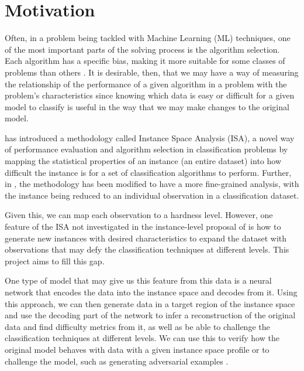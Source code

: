 \section{Motivation}
Often, in a problem being tackled with Machine Learning (ML) techniques, one of the most important parts of the solving process is the algorithm selection. Each algorithm has a specific bias, making it more suitable for some classes of problems than others \cite{Adam2019}. It is desirable, then, that we may have a way of measuring the relationship of the performance of a given algorithm in a problem with the problem's characteristics since knowing which data is easy or difficult for a given model to classify is useful in the way that we may make changes to the original model.

 has introduced a methodology called Instance Space Analysis (ISA), a novel way of performance evaluation and algorithm selection in classification problems by mapping the statistical properties of an instance (an entire dataset) into how difficult the instance is for a set of classification algorithms to perform. Further, in , the methodology has been modified to have a more fine-grained analysis, with the instance being reduced to an individual observation in a classification dataset.

Given this, we can map each observation to a hardness level. However, one feature of the ISA not investigated in the instance-level proposal of  is how to generate new instances with desired characteristics to expand the dataset with observations that may defy the classification techniques at different levels. This project aims to fill this gap. 

One type of model that may give us this feature from this data is a neural network that encodes the data into the instance space and decodes from it. Using this approach, we can then generate data in a target region of the instance space and use the decoding part of the network to infer a reconstruction of the original data and find difficulty metrics from it, as well as be able to challenge the classification techniques at different levels. We can use this to verify how the original model behaves with data with a given instance space profile or to challenge the model, such as generating adversarial examples \cite{Yuan2019}.
%

